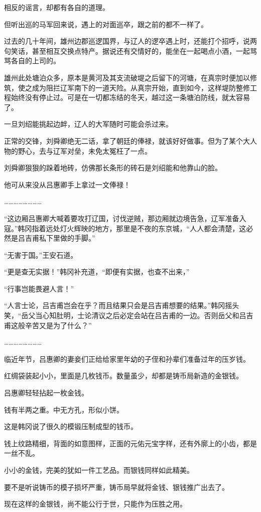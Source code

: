 相反的谣言，却都有各自的道理。

但听出巡的马军回来说，遇上的对面巡卒，跟之前的都不一样了。

过去的几十年间，雄州边郡巡逻国界，与辽人的逻卒遇上时，还能打个招呼，说两句笑话，甚至相互交换点特产。据说还有交情好的，能坐在一起喝点小酒，一起骂骂各自的上司的。

雄州此处塘泊众多，原本是黄河及其支流破堤之后留下的河塘，在真宗时便加以修筑，使之成为阻拦辽军南下的一道天险。从真宗开始，直到如今，这样堤防整修工程始终没有停止过。可是在一切都冻结的冬天，越过这一条塘泊防线，就太容易了。

一旦刘绍能挑起边衅，辽人的大军随时可能会杀过来。

正常的交锋，刘舜卿绝无二话，拿了朝廷的俸禄，就该好好做事。但为了某个大人物的野心，去与辽军对垒，未免太冤枉了一点。

刘舜卿狠狠的跺着地砖，仿佛那长条形的砖石是刘绍能和他靠山的脸。

他可从来没从吕惠卿手上拿过一文俸禄！

……………………

“这边厢吕惠卿大喊着要攻打辽国，讨伐逆贼，那边厢就边境告急，辽军准备入寇。”韩冈指着远处灯火辉映的地方，那里是不夜的东京城，“人人都会清楚，这必然是吕吉甫私下里做的手脚。”

“无害于国。”王安石道。

“更是查无实据！”韩冈补充道，“即便有实据，也查不出来，”

“行事岂能畏避人言！”

“人言士论，吕吉甫岂会在乎？而且结果只会是吕吉甫想要的结果。”韩冈摇头笑，“岳父当心知肚明，士论清议之后必定会站在吕吉甫的一边。否则岳父和吕吉甫这般辛苦又是为了什么？”

……………………

临近年节，吕惠卿的妻妾们正给给家里年幼的子侄和孙辈们准备过年的压岁钱。

红绸袋装起小小，里面是几枚钱币。数量虽少，却都是铸币局新造的金银钱。

吕惠卿轻轻拈起一枚金钱。

钱有半两之重。中无方孔，形似小饼。

这是韩冈说了很久的模锻压制成型的钱币。

钱上纹路精细，背面的如意图样，正面的元佑元宝字样，还有外廓上的小齿，都是一丝不乱。

小小的金钱，完美的犹如一件工艺品。而银钱同样如此精美。

要不是听说铸币的模子损坏严重，铸币局早就将金钱、银钱推广出去了。

现在这样的金银钱，尚不能公行于世，只能作为压胜之用。

